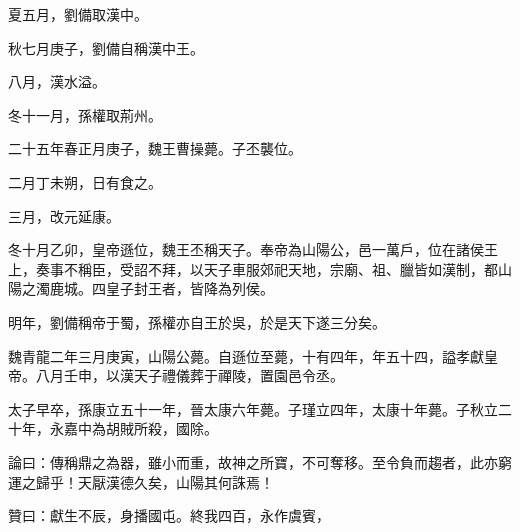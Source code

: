 \begin{pinyinscope}
夏五月，劉備取漢中。

秋七月庚子，劉備自稱漢中王。

八月，漢水溢。

冬十一月，孫權取荊州。

二十五年春正月庚子，魏王曹操薨。子丕襲位。

二月丁未朔，日有食之。

三月，改元延康。

冬十月乙卯，皇帝遜位，魏王丕稱天子。奉帝為山陽公，邑一萬戶，位在諸侯王上，奏事不稱臣，受詔不拜，以天子車服郊祀天地，宗廟、祖、臘皆如漢制，都山陽之濁鹿城。四皇子封王者，皆降為列侯。

明年，劉備稱帝于蜀，孫權亦自王於吳，於是天下遂三分矣。

魏青龍二年三月庚寅，山陽公薨。自遜位至薨，十有四年，年五十四，謚孝獻皇帝。八月壬申，以漢天子禮儀葬于禪陵，置園邑令丞。

太子早卒，孫康立五十一年，晉太康六年薨。子瑾立四年，太康十年薨。子秋立二十年，永嘉中為胡賊所殺，國除。

論曰：傳稱鼎之為器，雖小而重，故神之所寶，不可奪移。至令負而趨者，此亦窮運之歸乎！天厭漢德久矣，山陽其何誅焉！

贊曰：獻生不辰，身播國屯。終我四百，永作虞賓，


\end{pinyinscope}
